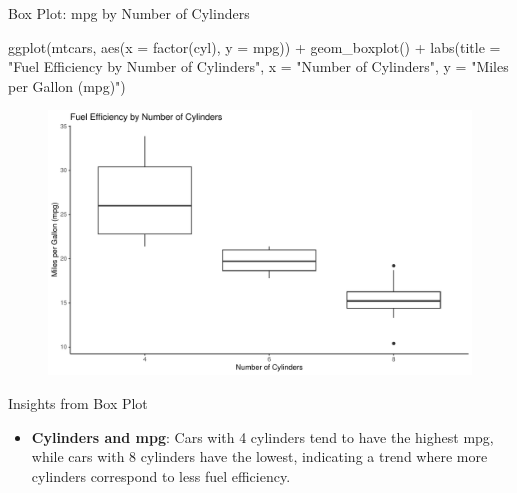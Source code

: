 \documentclass[
  18 pt,
  ignorenonframetext,
  aspectratio=1610,
]{beamer}
\newenvironment{Shaded}{\begin{snugshade}}{\end{snugshade}}
\newcommand{\AttributeTok}[1]{\textcolor[rgb]{0.40,0.45,0.13}{#1}}
\newcommand{\FunctionTok}[1]{\textcolor[rgb]{0.28,0.35,0.67}{#1}}
\newcommand{\NormalTok}[1]{\textcolor[rgb]{0.00,0.23,0.31}{#1}}
\newcommand{\SpecialCharTok}[1]{\textcolor[rgb]{0.37,0.37,0.37}{#1}}
\newcommand{\StringTok}[1]{\textcolor[rgb]{0.13,0.47,0.30}{#1}}
\providecommand{\tightlist}{%
  \setlength{\itemsep}{0pt}\setlength{\parskip}{0pt}}\usepackage{longtable,booktabs,array}
\begin{document}
\begin{frame}[fragile]{Box Plot: mpg by Number of Cylinders}
\protect\hypertarget{box-plot-mpg-by-number-of-cylinders}{}
\tiny

\begin{Shaded}
\begin{Highlighting}[]
\FunctionTok{ggplot}\NormalTok{(mtcars, }\FunctionTok{aes}\NormalTok{(}\AttributeTok{x =} \FunctionTok{factor}\NormalTok{(cyl), }\AttributeTok{y =}\NormalTok{ mpg)) }\SpecialCharTok{+}
  \FunctionTok{geom\_boxplot}\NormalTok{() }\SpecialCharTok{+}
  \FunctionTok{labs}\NormalTok{(}\AttributeTok{title =} \StringTok{"Fuel Efficiency by Number of Cylinders"}\NormalTok{,}
       \AttributeTok{x =} \StringTok{"Number of Cylinders"}\NormalTok{,}
       \AttributeTok{y =} \StringTok{"Miles per Gallon (mpg)"}\NormalTok{)}
\end{Highlighting}
\end{Shaded}

\begin{figure}

{\centering \includegraphics[width=\textwidth,height=0.5\textheight]{R-Regression_files/figure-beamer/unnamed-chunk-7-1.pdf}

}

\end{figure}

\begin{block}{Insights from Box Plot}
\protect\hypertarget{insights-from-box-plot}{}
\begin{itemize}
\tightlist
\item
  \textbf{Cylinders and mpg}: Cars with 4 cylinders tend to have the
  highest mpg, while cars with 8 cylinders have the lowest, indicating a
  trend where more cylinders correspond to less fuel efficiency.
  \normalsize
\end{itemize}
\end{block}
\end{frame}
\end{document}
